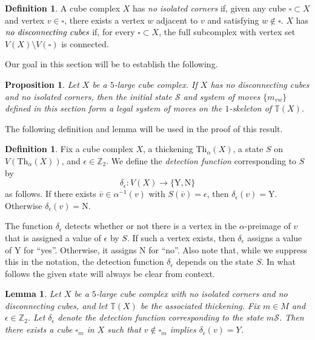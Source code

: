 \documentclass[12pt, letterpaper]{article}
\newcommand{\Z}{\mathbb{Z}}
\renewcommand{\a}{\alpha}
\def\Z{\mathbb{Z}}
\theoremstyle{plain}
\newtheorem{lem}[thm]{Lemma}
\newtheorem{prop}[thm]{Proposition}
\theoremstyle{definition}
\newtheorem{defn}[thm]{Definition}
\begin{document}
\begin{defn}
    A cube complex $X$ has \emph{no isolated corners} if, given any cube $\square \subset X$ and vertex $v\in \square$, there exists a vertex $w$ adjacent to $v$ and satisfying $w\notin \square$.
    $X$ has $\emph{no disconnecting cubes}$ if, for every $\square \subset X$, the full subcomplex with vertex set $V(X) \setminus V(\square)$ is connected.
\end{defn}

Our goal in this section will be to establish the following.

\begin{prop}\label{prop:BarryX-has-legal-system}
    Let $X$ be a $5$-large cube complex. If $X$ has no disconnecting cubes and no isolated corners, then the initial state $\mathcal{S}$ and system of moves $\{ m_{vw}\}$ defined in this section form a legal system of moves on the $1$-skeleton of $\mathbb{T}(X)$.
\end{prop}

The following definition and lemma will be used in the proof of this result.  

\begin{defn}
    Fix a cube complex $X$, a thickening Th$_\a(X)$, a state $S$ on $V(\text{Th}_\a(X))$, and $\epsilon \in \Z_2$. We define the \emph{detection function} corresponding to $S$ by
    \[ \delta_{\epsilon} \colon V(X) \longrightarrow \{ \text{Y}, \text{N} \} \]
    as follows. If there exists $\overline{v} \in \a^{-1}(v)$ with $S \left( \overline{v} \right) = \epsilon$, then $\delta_{\epsilon}(v) = \text{Y}$. Otherwise $\delta_{\epsilon}(v) = \text{N}$.
\end{defn}

The function $\delta_{\epsilon}$ detects whether or not there is a vertex in the $\a$-preimage of $v$ that is assigned a value of $\epsilon$ by $S$. If such a vertex exists, then $\delta_\epsilon$ assigns a value of Y for ``yes''. Otherwise, it assigns N for ``no''. Also note that, while we suppress this in the notation, the detection function $\delta_\epsilon$ depends on the state $S$. In what follows the given state will always be clear from context.

\begin{lem}\label{lem:maximal cube}
    Let $X$ be a $5$-large cube complex with no isolated corners and no disconnecting cubes, and let $\mathbb{T}(X)$ be the associated thickening.
    Fix $m \in M$ and $\epsilon \in \Z_2$. Let $\delta_\epsilon$ denote the detection function corresponding to the state $m \mathcal{S}$. Then there exists a cube $\square_m$ in $X$ such that $v \notin \square_m$ implies $\delta_{\epsilon}(v) = Y$.
\end{lem}
\end{document}
